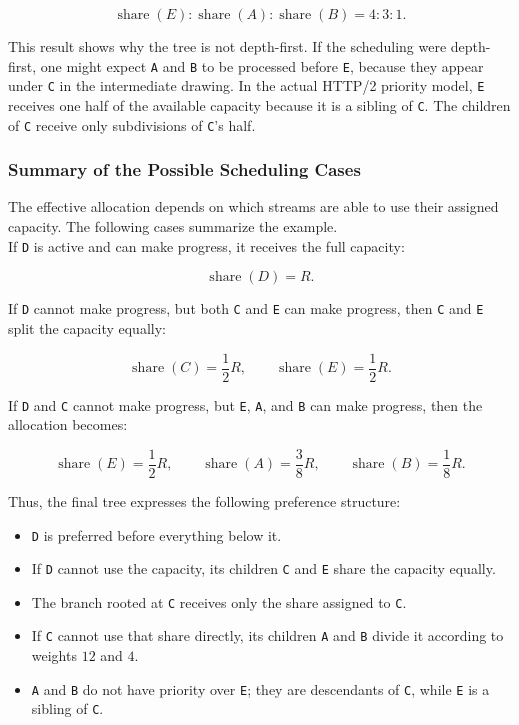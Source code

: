 \documentclass{scrbook}
\begin{document}
\[
\operatorname{share}(E)
:
\operatorname{share}(A)
:
\operatorname{share}(B)
=
4
:
3
:
1.
\]

This result shows why the tree is not depth-first. If the scheduling were depth-first, one might expect \texttt{A} and \texttt{B} to be processed before \texttt{E}, because they appear under \texttt{C} in the intermediate drawing. In the actual HTTP/2 priority model, \texttt{E} receives one half of the available capacity because it is a sibling of \texttt{C}. The children of \texttt{C} receive only subdivisions of \texttt{C}'s half.

\subsubsection{Summary of the Possible Scheduling Cases}

The effective allocation depends on which streams are able to use their assigned capacity. The following cases summarize the example.\\

If \texttt{D} is active and can make progress, it receives the full capacity:

\[
\operatorname{share}(D)=R.
\]

If \texttt{D} cannot make progress, but both \texttt{C} and \texttt{E} can make progress, then \texttt{C} and \texttt{E} split the capacity equally:

\[
\operatorname{share}(C)=\frac{1}{2}R,
\qquad
\operatorname{share}(E)=\frac{1}{2}R.
\]

If \texttt{D} and \texttt{C} cannot make progress, but \texttt{E}, \texttt{A}, and \texttt{B} can make progress, then the allocation becomes:

\[
\operatorname{share}(E)=\frac{1}{2}R,
\qquad
\operatorname{share}(A)=\frac{3}{8}R,
\qquad
\operatorname{share}(B)=\frac{1}{8}R.
\]

Thus, the final tree expresses the following preference structure:

\begin{itemize}
	\item \texttt{D} is preferred before everything below it.
	\item If \texttt{D} cannot use the capacity, its children \texttt{C} and \texttt{E} share the capacity equally.
	\item The branch rooted at \texttt{C} receives only the share assigned to \texttt{C}.
	\item If \texttt{C} cannot use that share directly, its children \texttt{A} and \texttt{B} divide it according to weights \(12\) and \(4\).
	\item \texttt{A} and \texttt{B} do not have priority over \texttt{E}; they are descendants of \texttt{C}, while \texttt{E} is a sibling of \texttt{C}.
\end{itemize}
\end{document}

